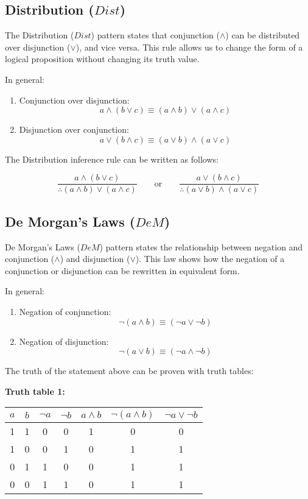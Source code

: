 \documentclass[12pt,a4paper,openany]{article}
\begin{document}
\subsection{Distribution (\(Dist\))}\label{distribution-dist}

The Distribution (\(Dist\)) pattern states that conjunction (\(\land\)) can be distributed over disjunction (\(\lor\)), and vice versa. This rule allows us to change the form of a logical proposition without changing its truth value.

In general:

\begin{enumerate}
\item Conjunction over disjunction:
  \[a \land (b \lor c) \equiv (a \land b) \lor (a \land c)\]
\item Disjunction over conjunction:
  \[a \lor (b \land c) \equiv (a \lor b) \land (a \lor c)\]
\end{enumerate}

The Distribution inference rule can be written as follows:

\[
\frac{a \land (b \lor c)}{\therefore (a \land b) \lor (a \land c)}
\qquad \text{or} \qquad
\frac{a \lor (b \land c)}{\therefore (a \lor b) \land (a \lor c)}
\]

\subsection{De Morgan's Laws (\(DeM\))}\label{de-morgans-laws-dem}

De Morgan's Laws (\(DeM\)) pattern states the relationship between negation and conjunction (\(\land\)) and disjunction (\(\lor\)). This law shows how the negation of a conjunction or disjunction can be rewritten in equivalent form.

In general:

\begin{enumerate}
\item Negation of conjunction:
  \[\lnot (a \land b) \equiv (\lnot a \lor \lnot b)\]
\item Negation of disjunction:
  \[\lnot (a \lor b) \equiv (\lnot a \land \lnot b)\]
\end{enumerate}

The truth of the statement above can be proven with truth tables:

\textbf{Truth table 1:}

\begin{center}
\begin{tabular}{|c|c|c|c|c|c|c|}
\hline
\(a\) & \(b\) & \(\neg a\) & \(\neg b\) & \(a \land b\) & \(\neg (a \land b)\) & \(\neg a \lor \neg b\) \\
\hline
1 & 1 & 0 & 0 & 1 & 0 & 0 \\
1 & 0 & 0 & 1 & 0 & 1 & 1 \\
0 & 1 & 1 & 0 & 0 & 1 & 1 \\
0 & 0 & 1 & 1 & 0 & 1 & 1 \\
\hline
\end{tabular}
\end{center}
\end{document}

